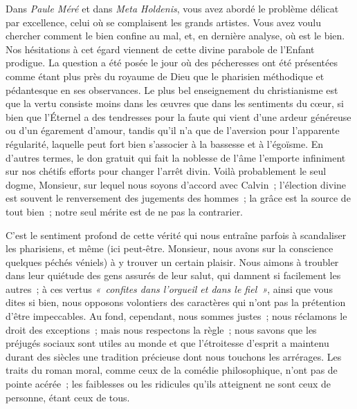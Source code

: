 \documentclass[french,twoside]{book} %
\newcommand\persName[1]{#1}
\begin{document}
Dans \emph{Paule Méré} et dans \emph{Meta Holdenis}, vous avez abordé le problème délicat par excellence, celui où se complaisent les grands artistes. Vous avez voulu chercher comment le bien confine au mal, et, en dernière analyse, où est le bien. Nos hésitations à cet égard viennent de cette divine parabole de l’Enfant prodigue. La question a été posée le jour où des pécheresses ont été présentées comme étant plus près du royaume de Dieu que le pharisien méthodique et pédantesque en ses observances. Le plus bel enseignement du christianisme est que la vertu consiste moins dans les œuvres que dans les sentiments du cœur, si bien que l’{\persName Éternel} a des tendresses pour la faute qui vient d’une ardeur généreuse ou d’un égarement d’amour, tandis qu’il n’a que de l’aversion pour l’apparente régularité, laquelle peut fort bien s’associer à la bassesse et à l’égoïsme. En d’autres termes, le don gratuit qui fait la noblesse de l’âme l’emporte infiniment sur nos chétifs efforts pour changer l’arrêt divin. Voilà probablement le seul dogme, Monsieur, sur lequel nous soyons d’accord avec {\persName Calvin} ; l’élection divine est souvent le renversement des jugements des hommes ; la grâce est la source de tout bien ; notre seul mérite est de ne pas la contrarier.\par
C’est le sentiment profond de cette vérité qui nous entraîne parfois à scandaliser les pharisiens, et même (ici peut-être. Monsieur, nous avons sur la conscience quelques péchés véniels) à y trouver un certain plaisir. Nous aimons à troubler dans leur quiétude des gens assurés de leur salut, qui damnent si facilement les autres ; à ces vertus \emph{« confites dans l’orgueil et dans le fiel »}, ainsi que vous dites si bien, nous opposons volontiers des caractères qui n’ont pas la prétention d’être impeccables. Au fond, cependant, nous sommes justes ; nous réclamons le droit des exceptions ; mais nous respectons la règle ; nous savons que les préjugés sociaux sont utiles au monde et que l’étroitesse d’esprit a maintenu durant des siècles une tradition précieuse dont nous touchons les arrérages. Les traits du roman moral, comme ceux de la comédie philosophique, n’ont pas de pointe acérée ; les faiblesses ou les ridicules qu’ils atteignent ne sont ceux de personne, étant ceux de tous.\par
\end{document}
